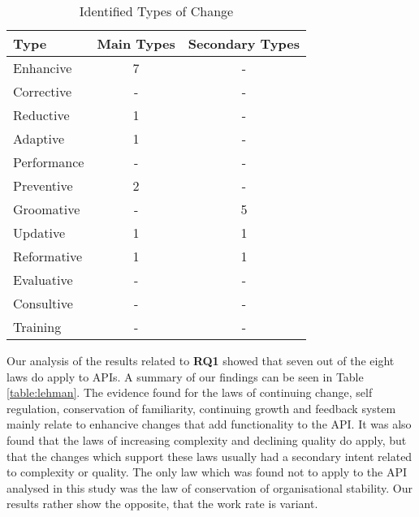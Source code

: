 \documentclass{sig-alternate}
\begin{document}
\begin{table}
       \centering
       \begin{tabular}[ht]{l|c|c}
              \toprule

              \textbf{Type}        & \textbf{Main Types}       &\textbf{Secondary Types}   \\ \midrule
              Enhancive            & 7                         & -                         \\ \hline
              Corrective           & -                         & -                         \\ \hline
              Reductive            & 1                         & -                         \\ \hline
              Adaptive             & 1                         & -                         \\ \hline
              Performance          & -                         & -                         \\ \hline
              Preventive           & 2                         & -                         \\ \hline
              Groomative           & -                         & 5                         \\ \hline
              Updative             & 1                         & 1                         \\ \hline
              Reformative          & 1                         & 1                         \\ \hline
              Evaluative           & -                         & -                         \\ \hline
              Consultive           & -                         & -                         \\ \hline
              Training             & -                         & -                         \\ 

              \bottomrule

       \end{tabular}
       \caption{Identified Types of Change}
       \label{table:type_counts}
\end{table}

Our analysis of the results related to \textbf{RQ1} showed that seven out of the eight laws \cite{lehman90sview} do apply to APIs. A summary of our findings can be seen in Table \ref{table:lehman}. The evidence found for the laws of continuing change, self regulation, conservation of familiarity, continuing growth and feedback system mainly relate to enhancive changes that add functionality to the API. It was also found that the laws of increasing complexity and declining quality do apply, but that the changes which support these laws usually had a secondary intent related to complexity or quality. The only law which was found not to apply to the API analysed in this study was the law of conservation of organisational stability. Our results rather show the opposite, that the work rate is variant. 
\end{document}
